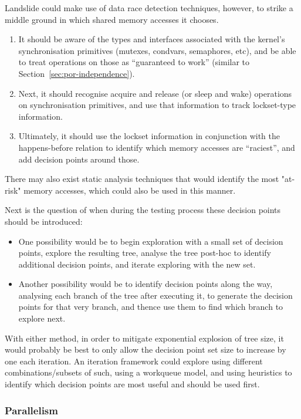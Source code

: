 Landslide could make use of data race detection techniques\cite{datacollider}, however, to strike a middle ground in which shared memory accesses it chooses.
\begin{enumerate}
	\item It should be aware of the types and interfaces associated with the kernel's synchronisation primitives (mutexes, condvars, semaphores, etc), and be able to treat operations on those as ``guaranteed to work'' (similar to Section~\ref{sec:por-independence}).
	\item Next, it should recognise acquire and release (or sleep and wake) operations on synchronisation primitives, and use that information to track lockset-type information.
	\item Ultimately, it should use the lockset information in conjunction with the happens-before relation to identify which memory accesses are ``raciest'', and add decision points around those.
\end{enumerate}

There may also exist static analysis techniques that would identify the most "at-risk" memory accesses, which could also be used in this manner.

Next is the question of when during the testing process these decision points should be introduced:

\begin{itemize}
	\item One possibility would be to begin exploration with a small set of decision points, explore the resulting tree, analyse the tree post-hoc to identify additional decision points, and iterate exploring with the new set.
	\item Another possibility would be to identify decision points along the way, analysing each branch of the tree after executing it, to generate the decision points for that very branch, and thence use them to find which branch to explore next.
\end{itemize}

With either method, in order to mitigate exponential explosion of tree size, it would probably be best to only allow the decision point set size to increase by one each iteration. An iteration framework could explore using different combinations/subsets of such, using a workqueue model, and using heuristics to identify which decision points are most useful and should be used first.

\subsubsection{Parallelism}

